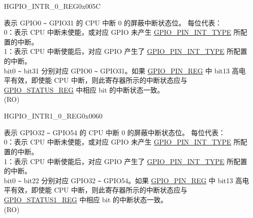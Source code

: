 \begin{register}{H}{GPIO\_INTR\_0\_REG}{0x005C}\label{regdesc:GPIOINTR0REG}
%
\regnewline%
\begin{regdesc}\begin{reglist}
\label{fielddesc:GPIOINT0}\item [GPIO\_INT\_0] 表示 GPIO0 \verb+~+ GPIO31 的 CPU 中断 0 的屏蔽中断状态位。 每位代表：\\
 0：表示 CPU 中断未使能，或对应 GPIO 未产生  \hyperref[fielddesc:GPIOPINNINTTYPE]{GPIO\_PIN\_INT\_TYPE} 所配置的中断。\\
1：表示 CPU 中断使能后，对应 GPIO 产生了  \hyperref[fielddesc:GPIOPINNINTTYPE]{GPIO\_PIN\_INT\_TYPE} 所配置的中断。\\
bit0 \verb+~+ bit31 分别对应 GPIO0 \verb+~+ GPIO31。如果  \hyperref[regdesc:GPIOPINNREG]{GPIO\_PIN\_REG} 中 bit13 高电平有效，即使能 CPU 中断，则此寄存器所示的中断状态应与  \hyperref[regdesc:GPIOSTATUSREG]{GPIO\_STATUS\_REG} 中相应 bit 的中断状态一致。\\
(RO)
\end{reglist}\end{regdesc}
\end{register}


\begin{register}{H}{GPIO\_INTR1\_0\_REG}{0x0060}\label{regdesc:GPIOINTR10REG}
%
%
\regnewline%
\begin{regdesc}\begin{reglist}
\label{fielddesc:GPIOINT10}\item [GPIO\_INT1\_0] 表示 GPIO32 \verb+~+ GPIO54 的 CPU 中断 0 的屏蔽中断状态位。 每位代表：\\
 0：表示 CPU 中断未使能，或对应 GPIO 未产生  \hyperref[fielddesc:GPIOPINNINTTYPE]{GPIO\_PIN\_INT\_TYPE} 所配置的中断。\\
1：表示 CPU 中断使能后，对应 GPIO 产生了  \hyperref[fielddesc:GPIOPINNINTTYPE]{GPIO\_PIN\_INT\_TYPE} 所配置的中断。\\
bit0 \verb+~+ bit22 分别对应 GPIO32 \verb+~+ GPIO54。如果  \hyperref[regdesc:GPIOPINNREG]{GPIO\_PIN\_REG} 中 bit13 高电平有效，即使能 CPU 中断，则此寄存器所示的中断状态应与  \hyperref[regdesc:GPIOSTATUS1REG]{GPIO\_STATUS1\_REG} 中相应 bit 的中断状态一致。\\
(RO)
\end{reglist}\end{regdesc}
\end{register}


